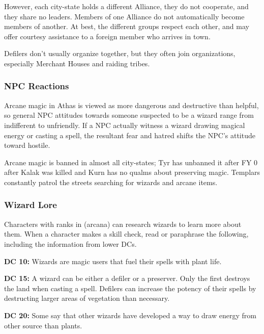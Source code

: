 However, each city-state holds a different Alliance, they do not cooperate, and they share no leaders. Members of one Alliance do not automatically become members of another. At best, the different groups respect each other, and may offer courtesy assistance to a foreign member who arrives in town.

Defilers don't usually organize together, but they often join organizations, especially Merchant Houses and raiding tribes.

\subsubsection{NPC Reactions}
Arcane magic in Athas is viewed as more dangerous and destructive than helpful, so general NPC attitudes towards someone suspected to be a wizard range from indifferent to unfriendly. If a NPC actually witness a wizard drawing magical energy or casting a spell, the resultant fear and hatred shifts the NPC's attitude toward hostile.

Arcane magic is banned in almost all city-states; Tyr has unbanned it after FY 0 after Kalak was killed and Kurn has no qualms about preserving magic. Templars constantly patrol the streets searching for wizards and arcane items.

\subsubsection{Wizard Lore}

Characters with ranks in  (arcana) can research wizards to learn more about them. When a character makes a skill check, read or paraphrase the following, including the information from lower DCs.

\textbf{DC 10:} Wizards are magic users that fuel their spells with plant life.

\textbf{DC 15:} A wizard can be either a defiler or a preserver. Only the first destroys the land when casting a spell. Defilers can increase the potency of their spells by destructing larger areas of vegetation than necessary.

\textbf{DC 20:} Some say that other wizards have developed a way to draw energy from other source than plants.


